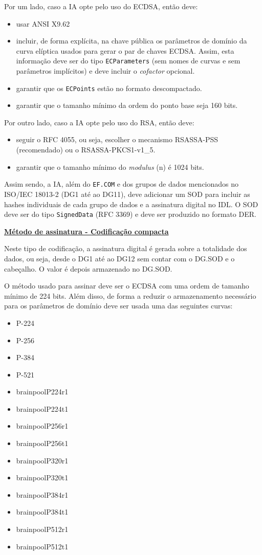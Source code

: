 Por um lado, caso a IA opte pelo uso do ECDSA, então deve:
\begin{itemize}
\item usar ANSI X9.62
\item incluir, de forma explícita, na chave pública os parâmetros de domínio da
curva elíptica usados para gerar o par de chaves ECDSA. Assim, esta
informação deve ser do tipo \texttt{ECParameters} (sem nomes de curvas e sem
parâmetros implícitos) e deve incluir o \emph{cofactor} opcional.
\item garantir que os \texttt{ECPoints} estão no formato descompactado.
\item garantir que o tamanho mínimo da ordem do ponto base seja 160 bits.
\end{itemize}

Por outro lado, caso a IA opte pelo uso do RSA, então deve:
\begin{itemize}
\item seguir o RFC 4055, ou seja, escolher o mecanismo RSASSA-PSS (recomendado)
ou o RSASSA-PKCS1-v1\_5.
\item garantir que o tamanho mínimo do \emph{modulus} (n) é 1024 bits.
\end{itemize}

Assim sendo, a IA, além do \texttt{EF.COM} e dos grupos de dados mencionados no
ISO/IEC 18013-2 (DG1 até ao DG11), deve adicionar um SOD para incluir
as hashes individuais de cada grupo de dados e a assinatura digital no IDL.
O SOD deve ser do tipo \texttt{SignedData} (RFC 3369) e deve ser produzido no
formato DER.


\vspace{0.6cm}
\underline{\textbf{Método de assinatura - Codificação compacta}}
\vspace{0.3cm}

Neste tipo de codificação, a assinatura digital é gerada sobre a
totalidade dos dados, ou seja, desde o DG1 até ao DG12 sem contar com o
DG.SOD e o cabeçalho. O valor é depois armazenado no DG.SOD.

O método usado para assinar deve ser o ECDSA com uma ordem de tamanho
mínimo de 224 bits. Além disso, de forma a reduzir o armazenamento
necessário para os parâmetros de domínio deve ser usada uma das seguintes
curvas:

\begin{itemize}
\item P-224
\item P-256
\item P-384
\item P-521
\item brainpoolP224r1
\item brainpoolP224t1
\item brainpoolP256r1
\item brainpoolP256t1
\item brainpoolP320r1
\item brainpoolP320t1
\item brainpoolP384r1
\item brainpoolP384t1
\item brainpoolP512r1
\item brainpoolP512t1
\end{itemize}

